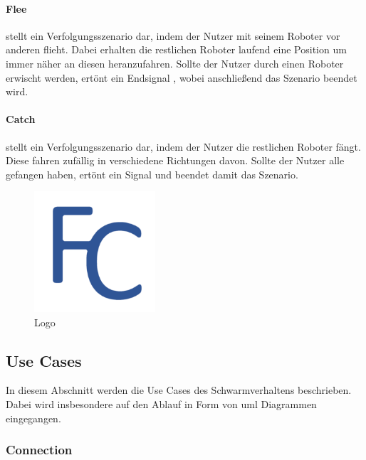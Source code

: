 \paragraph{Flee}

stellt ein Verfolgungsszenario dar, indem der Nutzer mit seinem Roboter vor anderen flieht. Dabei erhalten die restlichen Roboter laufend eine Position um immer näher an diesen heranzufahren. Sollte der Nutzer durch einen Roboter erwischt werden, ertönt ein Endsignal , wobei anschließend das Szenario beendet wird.

\paragraph{Catch}

stellt ein Verfolgungsszenario dar, indem der Nutzer die restlichen Roboter fängt. Diese fahren zufällig in verschiedene Richtungen davon. Sollte der Nutzer alle gefangen haben, ertönt ein Signal und beendet damit das Szenario.

\begin{figure}[h]
	\begin{center}
		\includegraphics[width=0.4\textwidth]{images/logos/UWP/FleeAndCatch_Logo.png}
	\end{center}
	\caption{Logo}
	\label{fig:Logo}
\end{figure}

\newpage
\color{process}
\subsection{Use Cases}

In diesem Abschnitt werden die Use Cases des Schwarmverhaltens beschrieben. Dabei wird insbesondere auf den Ablauf in Form von \gls{uml} Diagrammen eingegangen.

\subsubsection{Connection}

